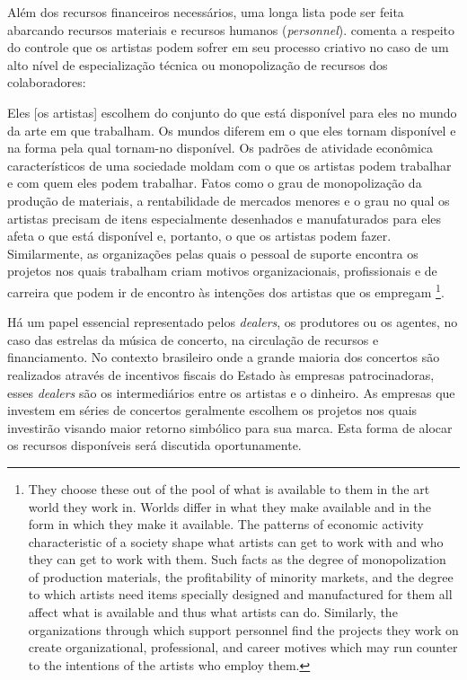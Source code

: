 \documentclass[a4paper, 12pt, openright, oneside, german, french, english, brazil]{abntex2}
\begin{document}
	Além dos recursos financeiros necessários, uma longa lista pode ser feita abarcando recursos materiais e recursos humanos (\textit{personnel}).  comenta a respeito do controle que os artistas podem sofrer em seu processo criativo no caso de um alto nível de especialização técnica ou monopolização de recursos dos colaboradores:
	
	\begin{citacao}
		Eles [os artistas] escolhem do conjunto do que está disponível para eles no mundo da arte em que trabalham. Os mundos diferem em o que eles tornam disponível e na forma pela qual tornam-no disponível. Os padrões de atividade econômica característicos de uma sociedade moldam com o que os artistas podem trabalhar e com quem eles podem trabalhar. Fatos como o grau de monopolização da produção de materiais, a rentabilidade de mercados menores e o grau no qual os artistas precisam de itens especialmente desenhados e manufaturados para eles afeta o que está disponível e, portanto, o que os artistas podem fazer. Similarmente, as organizações pelas quais o pessoal de suporte encontra os projetos nos quais trabalham criam motivos organizacionais, profissionais e de carreira que podem ir de encontro às intenções dos artistas que os empregam \footnote{They choose these out of the pool of what is available to them in the art world they work in. Worlds differ in what they make available and in the form in which they make it available. The patterns of economic activity characteristic of a society shape what artists can get to work with and who they can get to work with them. Such facts as the degree of monopolization of production materials, the profitability of minority markets, and the degree to which artists need items specially designed and manufactured for them all affect what is available and thus what artists can do. Similarly, the organizations through which support personnel find the projects they work on create organizational, professional, and career motives which may run counter to the intentions of the artists who employ them.}. \cite[p. 92]{becker2008art}
	\end{citacao}
	
	Há um papel essencial representado pelos \textit{dealers}, os produtores ou os agentes, no caso das estrelas da música de concerto, na circulação de recursos e financiamento. No contexto brasileiro onde a grande maioria dos concertos são realizados através de incentivos fiscais do Estado às empresas patrocinadoras, esses \textit{dealers} são os intermediários entre os artistas e o dinheiro. As empresas que investem em séries de concertos geralmente escolhem os projetos nos quais investirão visando maior retorno simbólico para sua marca. Esta forma de alocar os recursos disponíveis será discutida oportunamente.
	
\end{document}
